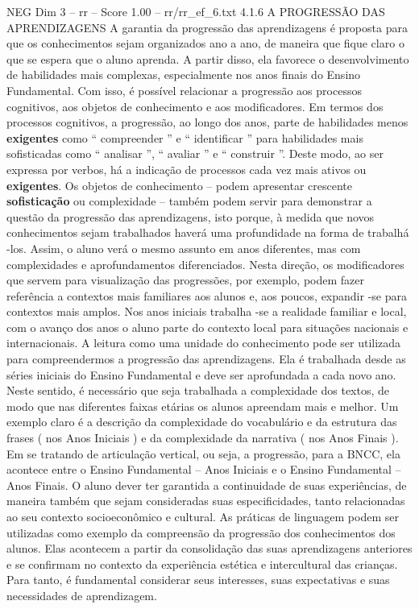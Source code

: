 \begin{textsample}{NEG Dim 3 – rr – Score 1.00 – rr/rr\_ef\_6.txt}  \label{ex:f3_neg_063}
4.1.6 A PROGRESSÃO DAS APRENDIZAGENS A garantia da progressão das aprendizagens é proposta para que os conhecimentos sejam organizados ano a ano, de maneira que fique claro o que se espera que o aluno aprenda.
A partir disso, ela favorece o desenvolvimento de habilidades mais complexas, especialmente nos anos finais do Ensino Fundamental.
Com isso, é possível relacionar a progressão aos processos cognitivos, aos objetos de conhecimento e aos modificadores.
Em termos dos processos cognitivos, a progressão, ao longo dos anos, parte de habilidades menos \textbf{exigentes} como “ compreender ” e “ identificar ” para habilidades mais sofisticadas como “ analisar ”, “ avaliar ” e “ construir ”.
Deste modo, ao ser expressa por verbos, há a indicação de processos cada vez mais ativos ou \textbf{exigentes}.
Os objetos de conhecimento – podem apresentar crescente \textbf{sofisticação} ou complexidade – também podem servir para demonstrar a questão da progressão das aprendizagens, isto porque, à medida que novos conhecimentos sejam trabalhados haverá uma profundidade na forma de trabalhá -los.
Assim, o aluno verá o mesmo assunto em anos diferentes, mas com complexidades e aprofundamentos diferenciados.
Nesta direção, os modificadores que servem para visualização das progressões, por exemplo, podem fazer referência a contextos mais familiares aos alunos e, aos poucos, expandir -se para contextos mais amplos.
Nos anos iniciais trabalha -se a realidade familiar e local, com o avanço dos anos o aluno parte do contexto local para situações nacionais e internacionais.
A leitura como uma unidade do conhecimento pode ser utilizada para compreendermos a progressão das aprendizagens.
Ela é trabalhada desde as séries iniciais do Ensino Fundamental e deve ser aprofundada a cada novo ano.
Neste sentido, é necessário que seja trabalhada a complexidade dos textos, de modo que nas diferentes faixas etárias os alunos apreendam mais e melhor.
Um exemplo claro é a descrição da complexidade do vocabulário e da estrutura das frases ( nos Anos Iniciais ) e da complexidade da narrativa ( nos Anos Finais ).
Em se tratando de articulação vertical, ou seja, a progressão, para a BNCC, ela acontece entre o Ensino Fundamental – Anos Iniciais e o Ensino Fundamental – Anos Finais.
O aluno dever ter garantida a continuidade de suas experiências, de maneira também que sejam consideradas suas especificidades, tanto relacionadas ao seu contexto socioeconômico e cultural.
As práticas de linguagem podem ser utilizadas como exemplo da compreensão da progressão dos conhecimentos dos alunos.
Elas acontecem a partir da consolidação das suas aprendizagens anteriores e se confirmam no contexto da experiência estética e intercultural das crianças.
Para tanto, é fundamental considerar seus interesses, suas expectativas e suas necessidades de aprendizagem.

\end{textsample}
